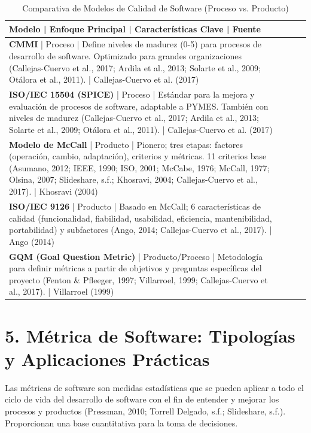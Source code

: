 \documentclass[11pt]{article}
\begin{document}
\begin{table}[h!]
\centering
\caption{Comparativa de Modelos de Calidad de Software (Proceso vs. Producto)}
\begin{tabular}{|l|l|l|l|}
\hline
Modelo | Enfoque Principal | Características Clave | Fuente \\
\hline
\textbf{CMMI} | Proceso | Define niveles de madurez (0-5) para procesos de desarrollo de software. Optimizado para grandes organizaciones (Callejas-Cuervo et al., 2017; Ardila et al., 2013; Solarte et al., 2009; Otálora et al., 2011). | Callejas-Cuervo et al. (2017) \\
\hline
\textbf{ISO/IEC 15504 (SPICE)} | Proceso | Estándar para la mejora y evaluación de procesos de software, adaptable a PYMES. También con niveles de madurez (Callejas-Cuervo et al., 2017; Ardila et al., 2013; Solarte et al., 2009; Otálora et al., 2011). | Callejas-Cuervo et al. (2017) \\
\hline
\textbf{Modelo de McCall} | Producto | Pionero; tres etapas: factores (operación, cambio, adaptación), criterios y métricas. 11 criterios base (Asumano, 2012; IEEE, 1990; ISO, 2001; McCabe, 1976; McCall, 1977; Olsina, 2007; Slideshare, s.f.; Khosravi, 2004; Callejas-Cuervo et al., 2017). | Khosravi (2004) \\
\hline
\textbf{ISO/IEC 9126} | Producto | Basado en McCall; 6 características de calidad (funcionalidad, fiabilidad, usabilidad, eficiencia, mantenibilidad, portabilidad) y subfactores (Ango, 2014; Callejas-Cuervo et al., 2017). | Ango (2014) \\
\hline
\textbf{GQM (Goal Question Metric)} | Producto/Proceso | Metodología para definir métricas a partir de objetivos y preguntas específicas del proyecto (Fenton \& Pfleeger, 1997; Villarroel, 1999; Callejas-Cuervo et al., 2017). | Villarroel (1999) \\
\hline
\end{tabular}
\end{table}

\section{5. Métrica de Software: Tipologías y Aplicaciones Prácticas}

Las métricas de software son medidas estadísticas que se pueden aplicar a todo el ciclo de vida del desarrollo de software con el fin de entender y mejorar los procesos y productos (Pressman, 2010; Torrell Delgado, s.f.; Slideshare, s.f.). Proporcionan una base cuantitativa para la toma de decisiones.
\end{document}
